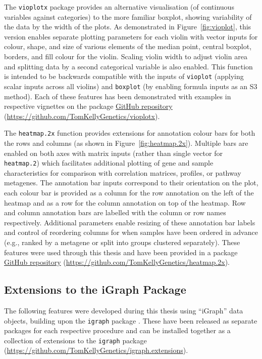 The \texttt{vioplotx} package provides an alternative visualisation (of continuous variables against categories) to the more familiar boxplot, showing variability of the data by the width of the plots. As demonstrated in Figure~\ref{fig:vioplot}, this version enables separate plotting parameters for each violin with vector inputs for colour, shape, and size of various elements of the median point, central boxplot, borders, and fill colour for the violin. Scaling violin width to adjust violin area and splitting data by a second categorical variable is also enabled. This function is intended to be backwards compatible with the inputs of \texttt{vioplot} (applying scalar inputs across all violins) and \texttt{boxplot} (by enabling formula inputs as an S3 method). Each of these features has been demonstrated with examples in respective vignettes on the package \href{https://github.com/TomKellyGenetics/vioplotx}{GitHub repository} (\url{https://github.com/TomKellyGenetics/vioplotx}).

The \texttt{heatmap.2x} function provides extensions for annotation colour bars for both the rows and columns (as shown in Figure~\ref{fig:heatmap.2x}). Multiple bars are enabled on both axes with matrix inputs (rather than single vector for \texttt{heatmap.2}) which facilitates additional plotting of gene and sample characteristics for comparison with correlation matrices,  profiles, or pathway \glspl{metagene}. The annotation bar inputs correspond to their orientation on the plot, each colour bar is provided as a column for the row annotation on the left of the heatmap and as a row for the column annotation on top of the heatmap. Row and column annotation bars are labelled with the column or row names respectively. Additional parameters enable resizing of these annotation bar labels and control of reordering columns for when samples have been ordered in advance (e.g., ranked by a \gls{metagene} or split into groups clustered separately).  These features were used through this thesis and have been provided in a package \href{https://github.com/TomKellyGenetics/heatmap.2x}{GitHub repository} (\url{https://github.com/TomKellyGenetics/heatmap.2x}).

\FloatBarrier

\subsection{Extensions to the iGraph Package} \label{methods:igraph_extensions}
The following features were developed during this thesis using ``iGraph'' data objects, building upon the \texttt{igraph} package \citep{igraph}. These have been released as separate packages for each respective procedure and can be installed together as a collection of extensions to the \texttt{igraph} package (\url{https://github.com/TomKellyGenetics/igraph.extensions}).

